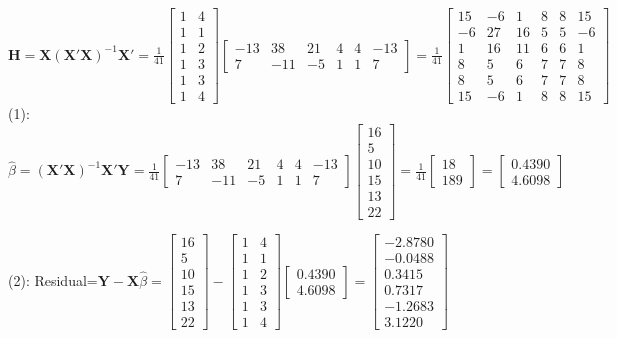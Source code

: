 \documentclass[12pt]{article}
\begin{document}
{$\textbf{H}=\textbf{X}(\textbf{X}'\textbf{X})^{-1}\textbf{X}'=\frac{1}{41}\begin{bmatrix}1&4\\1&1\\1&2\\1&3\\1&3\\1&4\end{bmatrix}\begin{bmatrix}-13&38&21&4&4&-13\\7&-11&-5&1&1&7\end{bmatrix}
=\frac{1}{41}\begin{bmatrix}15&-6&1&8&8&15\\-6&27&16&5&5&-6\\1&16&11&6&6&1\\8&5&6&7&7&8\\8&5&6&7&7&8\\15&-6&1&8&8&15\end{bmatrix}$
(1): $\hat{\beta}=(\textbf{X}'\textbf{X})^{-1}\textbf{X}'\textbf{Y}
=\frac{1}{41}\begin{bmatrix}-13&38&21&4&4&-13\\7&-11&-5&1&1&7\end{bmatrix}\begin{bmatrix}16\\5\\10\\15\\13\\22\end{bmatrix}
=\frac{1}{41}\begin{bmatrix}18\\189\end{bmatrix}=\begin{bmatrix}0.4390\\4.6098\end{bmatrix}$

(2): Residual=$\textbf{Y}-\textbf{X}\hat{\beta}
=\begin{bmatrix}16\\5\\10\\15\\13\\22\end{bmatrix}-\begin{bmatrix}1&4\\1&1\\1&2\\1&3\\1&3\\1&4\end{bmatrix}\begin{bmatrix}0.4390\\4.6098\end{bmatrix}
=\begin{bmatrix}-2.8780\\-0.0488\\0.3415\\0.7317\\-1.2683\\3.1220\end{bmatrix}$

}
\end{document}
